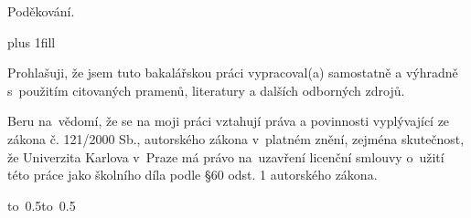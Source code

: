 \documentclass[12pt,a4paper]{report}
\let\openright=\clearpage
\begin{document}
\newpage



\openright

\noindent
Poděkování.

\newpage


\vglue 0pt plus 1fill

\noindent
Prohlašuji, že jsem tuto bakalářskou práci vypracoval(a) samostatně a výhradně
s~použitím citovaných pramenů, literatury a dalších odborných zdrojů.

\medskip\noindent
Beru na~vědomí, že se na moji práci vztahují práva a povinnosti vyplývající
ze zákona č. 121/2000 Sb., autorského zákona v~platném znění, zejména skutečnost,
že Univerzita Karlova v~Praze má právo na~uzavření licenční smlouvy o~užití této
práce jako školního díla podle §60 odst. 1 autorského zákona.

\vspace{10mm}

\hbox{\hbox to 0.5\hbox to 0.5}

\vspace{20mm}
\newpage

\end{document}
